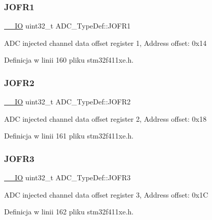 \subsubsection{\texorpdfstring{J\+O\+F\+R1}{JOFR1}}
{\footnotesize\ttfamily \hyperlink{core__sc300_8h_aec43007d9998a0a0e01faede4133d6be}{\+\_\+\+\_\+\+IO} uint32\+\_\+t A\+D\+C\+\_\+\+Type\+Def\+::\+J\+O\+F\+R1}

A\+DC injected channel data offset register 1, Address offset\+: 0x14 

Definicja w linii 160 pliku stm32f411xe.\+h.

\mbox{\label{struct_a_d_c___type_def_aa20f76044c11042dde41c1060853fb82}} 
\subsubsection{\texorpdfstring{J\+O\+F\+R2}{JOFR2}}
{\footnotesize\ttfamily \hyperlink{core__sc300_8h_aec43007d9998a0a0e01faede4133d6be}{\+\_\+\+\_\+\+IO} uint32\+\_\+t A\+D\+C\+\_\+\+Type\+Def\+::\+J\+O\+F\+R2}

A\+DC injected channel data offset register 2, Address offset\+: 0x18 

Definicja w linii 161 pliku stm32f411xe.\+h.

\mbox{\label{struct_a_d_c___type_def_ae9c78142f6edf8122384263878d09015}} 
\subsubsection{\texorpdfstring{J\+O\+F\+R3}{JOFR3}}
{\footnotesize\ttfamily \hyperlink{core__sc300_8h_aec43007d9998a0a0e01faede4133d6be}{\+\_\+\+\_\+\+IO} uint32\+\_\+t A\+D\+C\+\_\+\+Type\+Def\+::\+J\+O\+F\+R3}

A\+DC injected channel data offset register 3, Address offset\+: 0x1C 

Definicja w linii 162 pliku stm32f411xe.\+h.

\mbox{\label{struct_a_d_c___type_def_a92f5c1a5aaa8b286317f923482e09d35}} 

